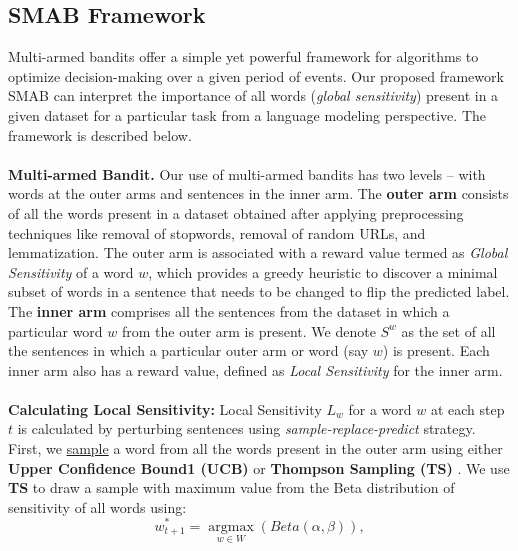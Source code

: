 \subsection{SMAB Framework}
\label{sec:SMAB}
Multi-armed bandits offer a simple yet powerful framework for algorithms to optimize decision-making over a given period of events. Our proposed framework SMAB can interpret the importance of all words (\textit{global sensitivity}) present in a given dataset for a particular task from a language modeling perspective. The framework is described below.\\
\\
\textbf{Multi-armed Bandit.} Our use of multi-armed bandits has two levels -- with words at the outer arms and sentences in the inner arm. The \textbf{outer arm} consists of all the words present in a dataset obtained after applying preprocessing techniques like removal of stopwords, removal of random URLs, and lemmatization. 
The outer arm is associated with a reward value termed as \textit{Global Sensitivity} of a word $w$, which provides a greedy heuristic to discover a minimal subset of words in a sentence that needs to be changed to flip the predicted label. The \textbf{inner arm} comprises all the sentences from the dataset in which a particular word \(w\) from the outer arm is present. We denote ${S}^{w}$ as the set of all the sentences in which a particular
outer arm or word (say \(w\)) is present. Each inner arm also has a reward value, defined as \textit{Local Sensitivity} for the inner arm.\\
\\
\textbf{Calculating Local Sensitivity: } Local Sensitivity ${L}_w$ for a word $w$ at each step $t$ is calculated by perturbing sentences using \textit{sample-replace-predict} strategy. First, we \underline{sample} a word from all the words present in the outer arm using either \textbf{Upper Confidence Bound1 (UCB)} \cite{auer2002finite} or \textbf{Thompson Sampling (TS)} \cite{thompson1933likelihood}. We use \textbf{TS} to draw a sample with maximum value from the Beta distribution of sensitivity of all words using:
\begin{equation}
    w^*_{t+1} = \operatorname*{argmax}_{w \in W} \left( Beta(\alpha, \beta) \right),
\end{equation}
